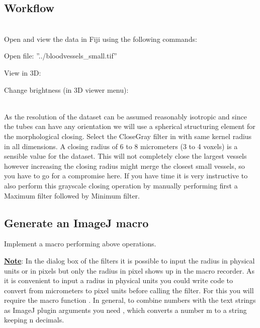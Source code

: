 \subsection{Workflow}
%
\begin{description}
%
\item[Data examination] \hfill \\ 
%
Open and view the data in Fiji using the following commands:

\item Open file:   ''../bloodvessels\_small.tif''
\item View in 3D: 
\item Change brightness (in 3D viewer menu): 
%
\item[Perform 3D morphological closing] \hfill \\ 
%
As the resolution of the dataset can be assumed reasonably isotropic and since the tubes can have any orientation we will use a spherical structuring element for the morphological closing. Select the CloseGray filter in  with same kernel radius in all dimensions. A closing radius of 6 to 8 micrometers (3 to 4 voxels) is a sensible value for the dataset. This will not completely close the largest vessels however increasing the closing radius might merge the closest small vessels, so you have to go for a compromise here.  If you have time it is very instructive to also perform this grayscale closing operation by manually performing first a Maximum filter followed by Minimum filter.
%
\end{description}

\subsection{Generate an ImageJ macro}

Implement a macro performing above operations.

\underline{\textbf{Note}}: In the dialog box of the filters it is possible to input the radius in physical units or in pixels but only the radius in pixel shows up in the macro recorder. As it is convenient to input a radius in physical units you could write code to convert from micrometers to pixel units before calling the filter. For this you will require the macro function . In general, to combine numbers with the text strings as ImageJ plugin arguments you need , which converts a number m to a string keeping n decimals. 
%

